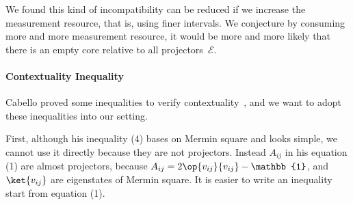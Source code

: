 \documentclass[english,reprint, aps, prl,superscriptaddress, showpacs,
showkeys, longbibliography, amsmath, amssymb]{revtex4-1}
\theoremstyle{plain}
\theoremstyle{definition}
\newcommand{\events}{\ensuremath{\mathcal{E}}}
\newcommand{\proj}[1]{\op{#1}{#1}}
\begin{document}
We found this kind of incompatibility can be reduced if we increase
the measurement resource, that is, using finer intervals. We conjecture
by consuming more and more measurement resource, it would be more
and more likely that there is an empty core relative to all projectors~$\events$.

\newpage{}

\paragraph{Contextuality Inequality}

Cabello proved some inequalities to verify contextuality~\cite{Cabello_2008},
and we want to adopt these inequalities into our setting.

First, although his inequality (4) bases on Mermin square and looks
simple, we cannot use it directly because they are not projectors.
Instead $A_{ij}$ in his equation (1) are almost projectors, because
$A_{ij}=2\proj{v_{ij}}-\mathbb{1}$, and $\ket{v_{ij}}$ are eigenstates
of Mermin square. It is easier to write an inequality start from equation
(1).


\end{document}
